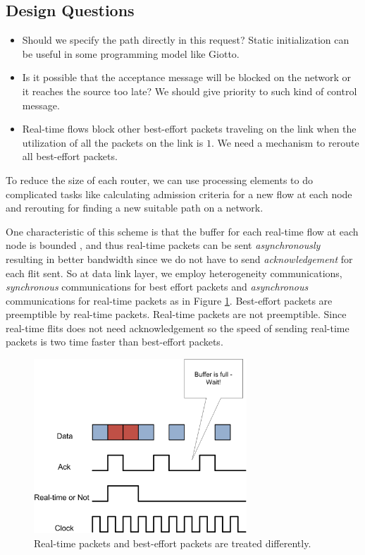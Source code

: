 \documentclass[conference, twocolumn]{IEEEtran}
\theoremstyle{definition}
\begin{document}
\subsection{Design Questions}
\begin{itemize}
\item Should we specify the path directly in this request? Static initialization 
can be useful in some programming model like Giotto.	
\item Is it possible that the acceptance message will be blocked on the network 
or it reaches the source too late? We should give priority to such kind of control
message.
\item Real-time flows block other best-effort packets traveling on the link when 
the utilization of all the packets on the link is $1$. We need a mechanism to
reroute all best-effort packets.
\end{itemize}

To reduce the size of each router, we can use processing elements to do 
complicated tasks like calculating admission criteria for a new flow at each node 
and rerouting for finding a new suitable path on a network.


One characteristic of this scheme is that the buffer for each 
real-time flow at each node is bounded \cite{Ferrari90ascheme}, and thus
real-time packets can be sent {\em asynchronously} resulting in better bandwidth
since we do not have to send {\em acknowledgement} for each flit sent. So at
data link layer, we employ heterogeneity communications, {\em synchronous}
communications for best effort packets and {\em asynchronous} communications
for real-time packets as in Figure \ref{fig:HeteroComm}. Best-effort packets
are preemptible by real-time packets. Real-time packets are not preemptible.
Since real-time flits does not need acknowledgement so the speed of sending
real-time packets is two time faster than best-effort packets.


\begin{figure}[htbp]
\centering
\includegraphics[width=8cm]{pics/HeteroComm.png}
\caption[Heterogeneous Communication for Packets.]
{Real-time packets and best-effort packets are treated
differently.}\label{fig:HeteroComm}
\end{figure}
\end{document}
